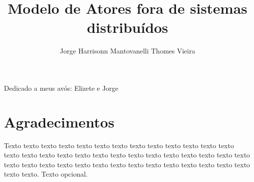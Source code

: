 \documentclass[a4paper,12pt,twoside,english,brazilian]{book}
\title{Modelo de Atores fora de sistemas distribuídos}[distribuindo aplicações centralizadas]
\author{Jorge Harrisonn Mantovanelli Thomes Vieira}
\begin{document}

\frontmatter

\pagestyle{plain}

\onehalfspacing %

\maketitle %


\begin{dedicatoria}
Dedicado a meus avós: Elizete e Jorge
\end{dedicatoria}


\chapter*{Agradecimentos}

Texto texto texto texto texto texto texto texto texto texto texto texto texto
texto texto texto texto texto texto texto texto texto texto texto texto texto
texto texto texto texto texto texto texto texto texto texto texto texto texto
texto texto texto texto. Texto opcional.





\cleardoublepage
\end{document}
